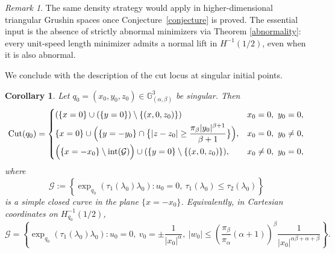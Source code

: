 \documentclass[12pt]{amsart}
\numberwithin{equation}{section}
\theoremstyle{plain}
\newtheorem{corollary}[theorem]{Corollary}%
\theoremstyle{definition}
\theoremstyle{remark}
\newtheorem{remark}[theorem]{Remark}%
\begin{document}
\begin{remark}
    The same density strategy would apply in higher-dimensional triangular Grushin spaces
    once Conjecture~\ref{conjecture} is proved. The essential input is the absence of
    strictly abnormal minimizers via Theorem \ref{abnormality}: every unit-speed length minimizer admits a normal lift in
    \(H^{-1}(1/2)\), even when it is also abnormal.
\end{remark}
We conclude with the description of the cut locus at singular initial points.
\begin{corollary}\label{cor:singular-cut-locus}
    Let \(q_0=(x_0,y_0,z_0)\in \mathbb G^3_{(\alpha,\beta)}\) be singular. Then
    \[
        \operatorname{Cut}(q_0)=
        \begin{cases}
            (\{x=0\}\cup(\{y=0\})\setminus\{(x,0,z_0)\})\,
             & x_0=0,\ y_0=0,     \\[1mm]
            \{x=0\}\cup
            \Bigl(
            \{y=-y_0\}
            \cap
            \bigl\{|z-z_0|\geq\dfrac{\pi_\beta |y_0|^{\beta+1}}{\beta+1}
            \bigr\}
            \Bigr),
             & x_0=0,\ y_0\neq 0, \\[2mm]
            \Bigl(\{x=-x_0\}\setminus \operatorname{int}(\mathcal G)\Bigr)\cup (\{y=0\}\setminus\{(x,0,z_0)\}),
             & x_0\neq 0,\ y_0=0,
        \end{cases}
    \]
    where
    \[
        \mathcal G
        :=
        \left\{
        \exp_{q_0}(\tau_1(\lambda_0)\lambda_0):
        u_0=0,\ \tau_1(\lambda_0)\leq \tau_2(\lambda_0)
        \right\}
    \]
    is a simple closed curve in the plane \(\{x=-x_0\}\). Equivalently, in Cartesian
    coordinates on \(H^{-1}_{q_0}(1/2)\),
    \[
        \mathcal G
        =
        \left\{
        \exp_{q_0}(\tau_1(\lambda_0)\lambda_0):
        u_0=0,\
        v_0=\pm \frac{1}{|x_0|^\alpha},\
        |w_0|
        \leq
        \left(
        \frac{\pi_\beta}{\pi_\alpha}(\alpha+1)
        \right)^\beta
        \frac{1}{|x_0|^{\alpha\beta+\alpha+\beta}}
        \right\}.
    \]
\end{corollary}
\end{document}
